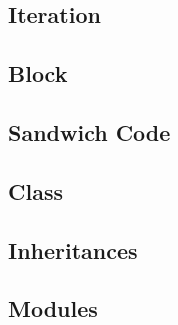 \subsection{Iteration}

\subsection{Block}

\subsection{Sandwich Code}

\subsection{Class}

\subsection{Inheritances}

\subsection{Modules}




























